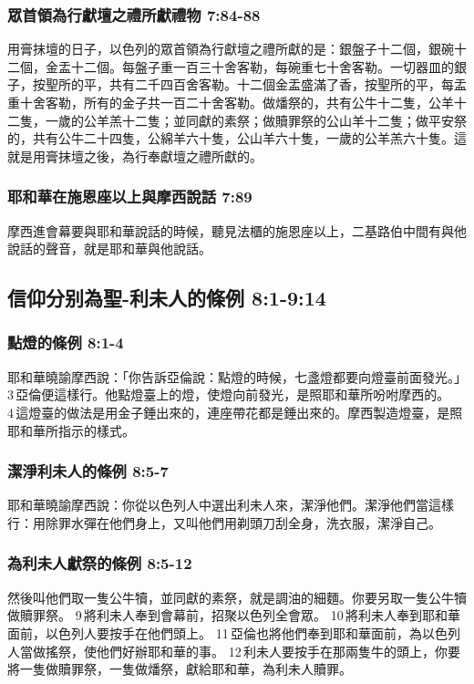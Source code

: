\subsubsection{眾首領為行獻壇之禮所獻禮物 7:84-88}
用膏抹壇的日子，以色列的眾首領為行獻壇之禮所獻的是：銀盤子十二個，銀碗十二個，金盂十二個。每盤子重一百三十舍客勒，每碗重七十舍客勒。一切器皿的銀子，按聖所的平，共有二千四百舍客勒。十二個金盂盛滿了香，按聖所的平，每盂重十舍客勒，所有的金子共一百二十舍客勒。做燔祭的，共有公牛十二隻，公羊十二隻，一歲的公羊羔十二隻；並同獻的素祭；做贖罪祭的公山羊十二隻；做平安祭的，共有公牛二十四隻，公綿羊六十隻，公山羊六十隻，一歲的公羊羔六十隻。這就是用膏抹壇之後，為行奉獻壇之禮所獻的。

\subsubsection{耶和華在施恩座以上與摩西說話 7:89}
摩西進會幕要與耶和華說話的時候，聽見法櫃的施恩座以上，二基路伯中間有與他說話的聲音，就是耶和華與他說話。

\subsection{信仰分别為聖-利未人的條例 8:1-9:14}
\subsubsection{點燈的條例 8:1-4 }
耶和華曉諭摩西說：「你告訴亞倫說：點燈的時候，七盞燈都要向燈臺前面發光。」 3 亞倫便這樣行。他點燈臺上的燈，使燈向前發光，是照耶和華所吩咐摩西的。 4 這燈臺的做法是用金子錘出來的，連座帶花都是錘出來的。摩西製造燈臺，是照耶和華所指示的樣式。

\subsubsection{潔淨利未人的條例 8:5-7}
\noindent
耶和華曉諭摩西說：你從以色列人中選出利未人來，潔淨他們。潔淨他們當這樣行：用除罪水彈在他們身上，又叫他們用剃頭刀刮全身，洗衣服，潔淨自己。
 
\subsubsection{為利未人獻祭的條例 8:5-12}
然後叫他們取一隻公牛犢，並同獻的素祭，就是調油的細麵。你要另取一隻公牛犢做贖罪祭。 9 將利未人奉到會幕前，招聚以色列全會眾。 10 將利未人奉到耶和華面前，以色列人要按手在他們頭上。 11 亞倫也將他們奉到耶和華面前，為以色列人當做搖祭，使他們好辦耶和華的事。 12 利未人要按手在那兩隻牛的頭上，你要將一隻做贖罪祭，一隻做燔祭，獻給耶和華，為利未人贖罪。

